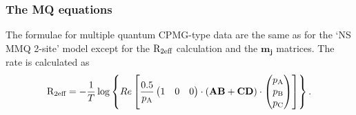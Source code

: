 \subsubsection{The MQ equations}

The formulae for multiple quantum CPMG-type data are the same as for the `NS MMQ 2-site' model except for the $\mathrm{R}_{\textrm{2eff}}$ calculation and the $\mathbf{m_j}$ matrices.
The rate is calculated as
\begin{equation}
    \mathrm{R}_{\textrm{2eff}} = - \frac{1}{T}
                 \log \left\{ Re \left[ \frac{0.5}{p_{\textrm{A}}}
                     \begin{pmatrix}1&0&0\end{pmatrix} \cdot \left( \mathbf{AB} + \mathbf{CD} \right) \cdot \begin{pmatrix}p_{\textrm{A}}\\p_{\textrm{B}}\\p_{\textrm{C}}\end{pmatrix}
                 \right] \right\}.
\end{equation}

